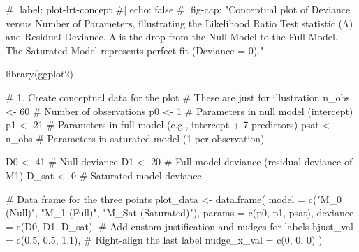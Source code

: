 \documentclass[
  letterpaper,
  DIV=11,
  numbers=noendperiod]{scrreprt}
\newenvironment{Shaded}{\begin{snugshade}}{\end{snugshade}}
\newcommand{\AttributeTok}[1]{\textcolor[rgb]{0.40,0.45,0.13}{#1}}
\newcommand{\CommentTok}[1]{\textcolor[rgb]{0.37,0.37,0.37}{#1}}
\newcommand{\DecValTok}[1]{\textcolor[rgb]{0.68,0.00,0.00}{#1}}
\newcommand{\FloatTok}[1]{\textcolor[rgb]{0.68,0.00,0.00}{#1}}
\newcommand{\FunctionTok}[1]{\textcolor[rgb]{0.28,0.35,0.67}{#1}}
\newcommand{\NormalTok}[1]{\textcolor[rgb]{0.00,0.23,0.31}{#1}}
\newcommand{\OtherTok}[1]{\textcolor[rgb]{0.00,0.23,0.31}{#1}}
\newcommand{\StringTok}[1]{\textcolor[rgb]{0.13,0.47,0.30}{#1}}
\begin{document}
\begin{Shaded}
\begin{Highlighting}[]
\CommentTok{\#| label: plot{-}lrt{-}concept}
\CommentTok{\#| echo: false}
\CommentTok{\#| fig{-}cap: "Conceptual plot of Deviance versus Number of Parameters, illustrating the Likelihood Ratio Test statistic (Λ) and Residual Deviance. Λ is the drop from the Null Model to the Full Model. The Saturated Model represents perfect fit (Deviance = 0)."}

\FunctionTok{library}\NormalTok{(ggplot2)}

\CommentTok{\# 1. Create conceptual data for the plot}
\CommentTok{\# These are just for illustration}
\NormalTok{n\_obs }\OtherTok{\textless{}{-}} \DecValTok{60} \CommentTok{\# Number of observations}
\NormalTok{p0 }\OtherTok{\textless{}{-}} \DecValTok{1}     \CommentTok{\# Parameters in null model (intercept)}
\NormalTok{p1 }\OtherTok{\textless{}{-}} \DecValTok{21}    \CommentTok{\# Parameters in full model (e.g., intercept + 7 predictors)}
\NormalTok{psat }\OtherTok{\textless{}{-}}\NormalTok{ n\_obs }\CommentTok{\# Parameters in saturated model (1 per observation)}

\NormalTok{D0 }\OtherTok{\textless{}{-}} \DecValTok{41} \CommentTok{\# Null deviance}
\NormalTok{D1 }\OtherTok{\textless{}{-}} \DecValTok{20} \CommentTok{\# Full model deviance (residual deviance of M1)}
\NormalTok{D\_sat }\OtherTok{\textless{}{-}} \DecValTok{0} \CommentTok{\# Saturated model deviance}

\CommentTok{\# Data frame for the three points}
\NormalTok{plot\_data }\OtherTok{\textless{}{-}} \FunctionTok{data.frame}\NormalTok{(}
  \AttributeTok{model =} \FunctionTok{c}\NormalTok{(}\StringTok{"M\_0 (Null)"}\NormalTok{, }\StringTok{"M\_1 (Full)"}\NormalTok{, }\StringTok{"M\_Sat (Saturated)"}\NormalTok{),}
  \AttributeTok{params =} \FunctionTok{c}\NormalTok{(p0, p1, psat),}
  \AttributeTok{deviance =} \FunctionTok{c}\NormalTok{(D0, D1, D\_sat),}
  \CommentTok{\# Add custom justification and nudges for labels}
  \AttributeTok{hjust\_val =} \FunctionTok{c}\NormalTok{(}\FloatTok{0.5}\NormalTok{, }\FloatTok{0.5}\NormalTok{, }\FloatTok{1.1}\NormalTok{), }\CommentTok{\# Right{-}align the last label}
  \AttributeTok{nudge\_x\_val =} \FunctionTok{c}\NormalTok{(}\DecValTok{0}\NormalTok{, }\DecValTok{0}\NormalTok{, }\DecValTok{0}\NormalTok{) }
\NormalTok{)}


\end{Highlighting}
\end{Shaded}
\end{document}
